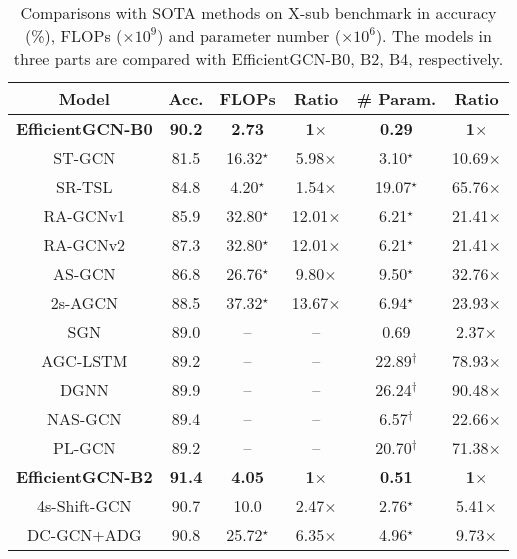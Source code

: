 \documentclass[10pt,journal,compsoc]{IEEEtran}
\begin{document}
\begin{table}[t]
  \caption{Comparisons with SOTA methods on X-sub benchmark in accuracy (\%), FLOPs ($\times10^9$) and parameter number ($\times10^6$). The models in three parts are compared with EfficientGCN-B0, B2, B4, respectively.}
  \label{tab:complexity}
  \vspace{-0.4cm}
  \centering
  \setlength{\tabcolsep}{4pt}
  \renewcommand{\arraystretch}{1.2}
  \begin{tabular}{cc|cc|cc}
  \toprule
  Model & Acc. & FLOPs & Ratio & \# Param. & Ratio \\
  \midrule
  {\bf EfficientGCN-B0} & {\bf 90.2} & {\bf 2.73} & {\bf 1$\times$} & {\bf 0.29} & {\bf 1$\times$} \\
  ST-GCN \cite{yan2018spatial} & 81.5 & 16.32$^\star$ & 5.98$\times$ & 3.10$^\star$ & 10.69$\times$ \\
  SR-TSL \cite{si2018skeleton} & 84.8 & 4.20$^\star$ & 1.54$\times$ & 19.07$^\star$ & 65.76$\times$ \\
  RA-GCNv1 \cite{song2019richly} & 85.9 & 32.80$^\star$ & 12.01$\times$ & 6.21$^\star$ & 21.41$\times$ \\
  RA-GCNv2 \cite{song2020richly} & 87.3 & 32.80$^\star$ & 12.01$\times$ & 6.21$^\star$ & 21.41$\times$ \\
  AS-GCN \cite{li2019actional} & 86.8 & 26.76$^\star$ & 9.80$\times$ & 9.50$^\star$ & 32.76$\times$ \\
  2s-AGCN \cite{shi2019two} & 88.5 & 37.32$^\star$ & 13.67$\times$ & 6.94$^\star$ & 23.93$\times$ \\
  SGN \cite{zhang2020semantics} & 89.0 & -- & -- & 0.69 & 2.37$\times$ \\
  AGC-LSTM \cite{si2019attention} & 89.2 & -- & -- & 22.89$^\dagger$ & 78.93$\times$ \\
  DGNN \cite{shi2019skeleton} & 89.9 & -- & -- & 26.24$^\dagger$ & 90.48$\times$ \\
  NAS-GCN \cite{peng2020learning} & 89.4 & -- & -- & 6.57$^\dagger$ & 22.66$\times$ \\
  PL-GCN \cite{huang2020part} & 89.2 & -- & -- & 20.70$^\dagger$ & 71.38$\times$ \\
  \midrule
  {\bf EfficientGCN-B2} & {\bf 91.4} & {\bf 4.05} & {\bf 1$\times$} & {\bf 0.51} & {\bf 1$\times$} \\
  4s-Shift-GCN \cite{cheng2020skeleton} & 90.7 & 10.0 & 2.47$\times$ & 2.76$^\star$ & 5.41$\times$ \\
  DC-GCN+ADG \cite{cheng2020decoupling} & 90.8 & 25.72$^\star$ & 6.35$\times$ & 4.96$^\star$ & 9.73$\times$ \\

\end{tabular}
\end{table}
\end{document}

